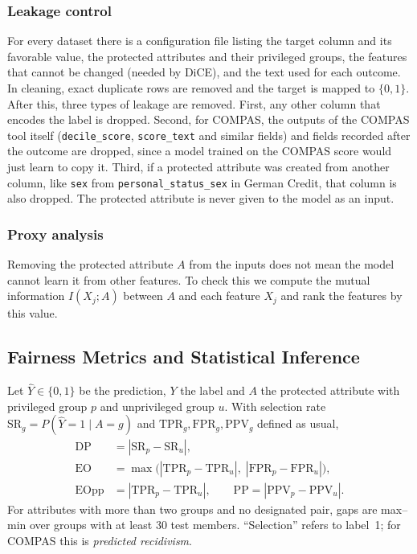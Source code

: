 \documentclass[conference]{IEEEtran}
\newcommand{\DP}{\mathrm{DP}}
\newcommand{\EO}{\mathrm{EO}}
\begin{document}
\subsubsection{Leakage control} For every dataset there is a configuration file listing the target column and its favorable value, the protected attributes and their privileged groups, the features that cannot be changed (needed by DiCE), and the text used for each outcome. In cleaning, exact duplicate rows are removed and the target is mapped to $\{0,1\}$. After this, three types of leakage are removed. First, any other column that encodes the label is dropped. Second, for COMPAS, the outputs of the COMPAS tool itself (\texttt{decile\_score}, \texttt{score\_text} and similar fields) and fields recorded after the outcome are dropped, since a model trained on the COMPAS score would just learn to copy it. Third, if a protected attribute was created from another column, like \texttt{sex} from \texttt{personal\_status\_sex} in German Credit, that column is also dropped. The protected attribute is never given to the model as an input.

\subsubsection{Proxy analysis} Removing the protected attribute $A$ from the inputs does not mean the model cannot learn it from other features. To check this we compute the mutual information $I(X_j;A)$ between $A$ and each feature $X_j$ and rank the features by this value.

\subsection{Fairness Metrics and Statistical Inference}
Let $\hat{Y}\in\{0,1\}$ be the prediction, $Y$ the label and $A$ the protected attribute with privileged group $p$ and unprivileged group $u$. With selection rate $\mathrm{SR}_g=P(\hat{Y}{=}1\mid A{=}g)$ and $\mathrm{TPR}_g,\mathrm{FPR}_g,\mathrm{PPV}_g$ defined as usual,
\begin{align}
\DP &= |\mathrm{SR}_p-\mathrm{SR}_u|,\\
\EO &= \max\big(|\mathrm{TPR}_p-\mathrm{TPR}_u|,\;|\mathrm{FPR}_p-\mathrm{FPR}_u|\big),\\
\mathrm{EOpp} &= |\mathrm{TPR}_p-\mathrm{TPR}_u|,\qquad \mathrm{PP}=|\mathrm{PPV}_p-\mathrm{PPV}_u|.
\end{align}
For attributes with more than two groups and no designated pair, gaps are max--min over groups with at least 30 test members. ``Selection'' refers to label~1; for COMPAS this is \emph{predicted recidivism}.
\end{document}

